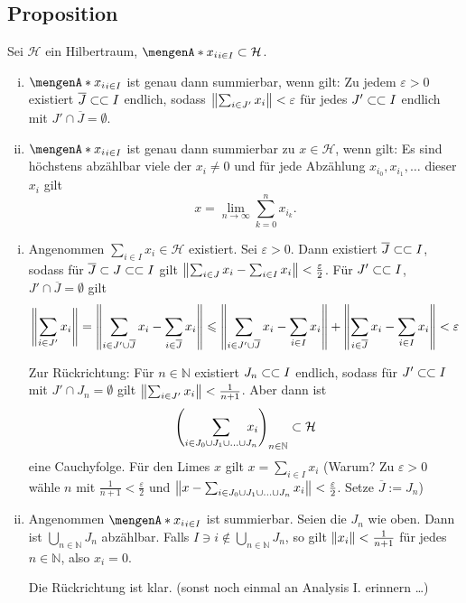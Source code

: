 \subsection{Proposition} %
\label{sub:717}
Sei $\mathcal{H}$ ein Hilbertraum, $\set{x_i}_{i \in I} \subset \mathcal{H}$. 
\begin{enumerate}[(i)]
	\item $\set{x_i}_{i \in I}$ ist genau dann summierbar, wenn gilt: Zu jedem $\varepsilon>0$ existiert $\overline{J} \finSub I$ endlich, sodass 
	$\norm{\sum_{i \in J'}x_i}< \varepsilon$ für jedes $J' \finSub I$ endlich mit $J' \cap \overline{J} = \emptyset$.
	\item $\set{x_i}_{i \in I}$ ist genau dann summierbar zu $x \in \mathcal{H}$, wenn gilt: Es sind höchstens abzählbar viele der $x_i \not=0$ und für jede Abzählung 
	$x_{i_0}, x_{i_1}, \ldots $ dieser $x_i$ gilt 
	\[
		x= \lim_{n \to \infty} \sum_{k=0}^{n} x_{i_k}.
	\]
\end{enumerate}
\begin{enumerate}[(i)]
	\item Angenommen $\sum_{i\in I} x_i \in \mathcal{H}$ existiert. Sei $\varepsilon>0$. Dann existiert $\overline{J}\finSub I$, sodass für $\overline{J}\subset J\finSub I$ 
	gilt $\norm{\sum_{i \in J} x_i - \sum_{i \in I} x_i} < \frac{\varepsilon}{2}$. Für $J' \finSub I$, $J' \cap \overline{J}=\emptyset$ gilt
	\begin{align*}
		\norm{\sum_{i \in J'} x_i} = \norm{\sum_{i \in J' \cup \overline{J}} x_i - \sum_{i \in \overline{J}} x_i}  \le \norm{\sum_{i \in J' \cup \overline{J}}x_i - \sum_{i \in I} x_i} + \norm{\sum_{i \in \overline{J}} x_i - \sum_{i \in I}x_i}< \varepsilon  
	\end{align*}
	
	Zur Rückrichtung: Für $n \in \mathds{N}$ existiert $J_n \finSub I$ endlich, sodass für $J' \finSub I$ mit $J' \cap J_n = \emptyset$ gilt 
	$\norm{\sum_{i \in J'} x_i}< \frac{1}{n+1}$. Aber dann ist 
	\begin{align*}
		\enbrace*{\sum_{i \in J_0 \cup J_1 \cup \ldots \cup J_n} \hspace{-1em} x_i}_{n \in \mathds{N}} \subset \mathcal{H}
	\end{align*}
	eine Cauchyfolge. Für den Limes $x$ gilt $x= \sum_{i \in I} x_i$ (Warum? Zu $\varepsilon>0$ wähle $n$ mit $\frac{1}{n+1}<\frac{\varepsilon}{2}$ und 
	$\norm{x - \sum_{i \in J_0 \cup J_1 \cup \ldots \cup J_n} x_i}< \frac{\varepsilon}{2}$. Setze $\overline{J}:= J_n$)
	\item Angenommen $\set{x_i}_{i \in I}$ ist summierbar. Seien die $J_n$ wie oben. Dann ist $\bigcup_{n \in \mathds{N}} J_n$ abzählbar. Falls 
	$I \ni i \not\in \bigcup_{n \in \mathds{N}} J_n$, so gilt $\norm{x_i} < \frac{1}{n+1}$ für jedes $n \in \mathds{N}$, also $x_i=0$.
	
	Die Rückrichtung ist klar. (sonst noch einmal an Analysis I. erinnern \ldots ) \bewende
\end{enumerate}

